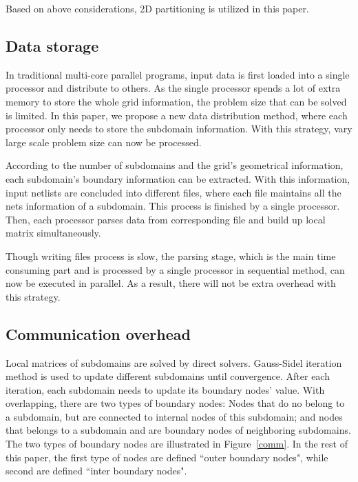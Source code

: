 \documentclass{sig-alternate}
\begin{document}
	Based on above considerations, 2D partitioning is utilized in this paper. 
  \subsection{Data storage}
\begin{comment}
	In parallel program, it is very important to keep data balanced among processors. This is not only true for computing
	consideration, but also for memory storage consideration. 
\end{comment}
	In traditional multi-core parallel programs, input data is first loaded into a single processor 
	and distribute to others. As the single processor spends a lot of extra memory to store the whole grid information,
	the problem size that can be solved is limited. In this paper, we propose a new data distribution method, where each processor
	only needs to store the subdomain information. With this strategy, vary large scale problem size can now be processed.

	According to the number of subdomains and the grid's geometrical information, each subdomain's boundary information can be 
	extracted. With this information, input netlists are concluded into different files, where each file maintains all the nets 
	information of a subdomain. This process is finished by a single processor. Then, each processor parses data from 
	corresponding file and build up local matrix simultaneously.

	Though writing files process is slow, the parsing stage, which is the main time consuming part and is 
	processed by a single processor in sequential method, can now be executed in parallel. As a result, 
	there will not be extra overhead with this strategy. 
     \subsection{Communication overhead}
	Local matrices of subdomains are solved by direct solvers. Gauss-Sidel iteration method is used
	to update different subdomains until convergence. After each iteration, each subdomain needs to update its 
	boundary nodes' value. With overlapping, there are two types of boundary nodes: Nodes that do no 
	belong to a subdomain, but are connected to internal nodes of 
	this subdomain; and nodes that belongs to a subdomain and are boundary nodes of neighboring subdomains. The 
	two types of boundary nodes are illustrated in Figure~\ref{comm}. In the rest of this paper, the first type of nodes are defined
	``outer boundary nodes", while second are defined ``inter boundary nodes". 
\end{document}

